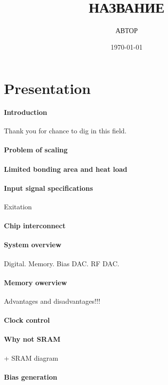 \documentclass[a4paper,12pt]{article} %
\author{АВТОР }
\title{НАЗВАНИЕ}
\date{\today}
\begin{document}

\section{Presentation}
\paragraph{Introduction}
Thank you for chance to dig in this field.

\paragraph{Problem of scaling}


\paragraph{Limited bonding area and heat load}
\paragraph{Input signal specifications} Exitation
\paragraph{Chip interconnect}

\paragraph{System overview} Digital. Memory. Bias DAC. RF DAC.
\paragraph{Memory owerview}
Advantages and disadvantages!!!
\paragraph{Clock control}
\paragraph{Why not SRAM} + SRAM diagram
\paragraph{Bias generation}
\end{document}
